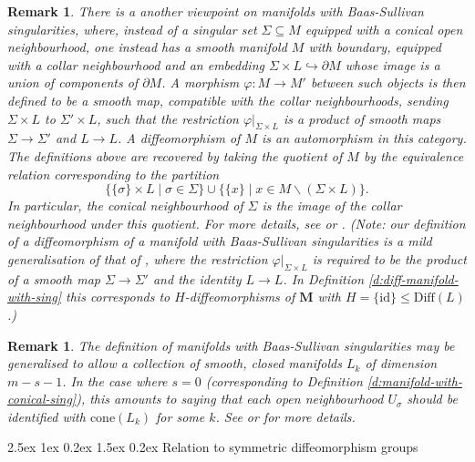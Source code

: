 \documentclass[reqno,a4paper]{article}
\makeatletter
\numberwithin{equation}{section}
\theoremstyle{italicised}
\theoremstyle{upright}
\newtheorem{rmk}[thm]{Remark}
\theoremstyle{italicised-restate}
\renewcommand*{\subsection}{\@startsection{subsection}{2}{\z@}%
	{2.5ex \@plus 1ex \@minus 0.2ex}%
	{1.5ex \@plus 0.2ex}%
	{\normalfont\normalsize\bfseries}}
\renewcommand{\leq}{\leqslant}
\makeatother
\begin{document}
\begin{rmk}
There is a another viewpoint on manifolds with Baas-Sullivan singularities, where, instead of a singular set $\Sigma \subseteq M$ equipped with a conical open neighbourhood, one instead has a smooth manifold $M$ with boundary, equipped with a collar neighbourhood and an embedding $\Sigma \times L \hookrightarrow \partial M$ whose image is a union of components of $\partial M$. A morphism $\varphi \colon M \to M'$ between such objects is then defined to be a smooth map, compatible with the collar neighbourhoods, sending $\Sigma \times L$ to $\Sigma' \times L$, such that the restriction $\varphi|_{\Sigma \times L}$ is a product of smooth maps $\Sigma \to \Sigma'$ and $L \to L$. A diffeomorphism of $M$ is an automorphism in this category. The definitions above are recovered by taking the quotient of $M$ by the equivalence relation corresponding to the partition
\[
\{ \{\sigma\} \times L \mid \sigma \in \Sigma \} \cup \{ \{x\} \mid x \in M \smallsetminus (\Sigma \times L) \}.
\]
In particular, the conical neighbourhood of $\Sigma$ is the image of the collar neighbourhood under this quotient. For more details, see \cite{Botvinnik1992Manifoldswithsingularities} or \cite{Perlmutter2015Cobordismcategorymanifolds}. (Note: our definition of a diffeomorphism of a manifold with Baas-Sullivan singularities is a mild generalisation of that of \cite[Definition 3.1]{Perlmutter2015Cobordismcategorymanifolds}, where the restriction $\varphi|_{\Sigma \times L}$ is required to be the product of a smooth map $\Sigma \to \Sigma'$ and the identity $L \to L$. In Definition \ref{d:diff-manifold-with-sing} this corresponds to $H$-diffeomorphisms of $\mathbf{M}$ with $H = \{\mathrm{id}\} \leq \mathrm{Diff}(L)$.)
\end{rmk}

\begin{rmk}
The definition of manifolds with Baas-Sullivan singularities may be generalised to allow a collection of smooth, closed manifolds $L_k$ of dimension $m-s-1$. In the case where $s=0$ (corresponding to Definition \ref{d:manifold-with-conical-sing}), this amounts to saying that each open neighbourhood $U_\sigma$ should be identified with $\mathrm{cone}(L_k)$ for some $k$. See \cite{Botvinnik1992Manifoldswithsingularities} or \cite{Perlmutter2013CobordismCategoryof} for more details.
\end{rmk}


\subsection{Relation to symmetric diffeomorphism groups}\label{ss:rel-symm-diff}
\end{document}
